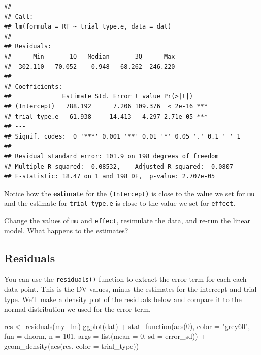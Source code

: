 \documentclass[
  oneside]{book}
\newenvironment{Shaded}{\begin{snugshade}}{\end{snugshade}}
\newcommand{\AttributeTok}[1]{\textcolor[rgb]{0.77,0.63,0.00}{#1}}
\newcommand{\DecValTok}[1]{\textcolor[rgb]{0.00,0.00,0.81}{#1}}
\newcommand{\FunctionTok}[1]{\textcolor[rgb]{0.00,0.00,0.00}{#1}}
\newcommand{\NormalTok}[1]{#1}
\newcommand{\OtherTok}[1]{\textcolor[rgb]{0.56,0.35,0.01}{#1}}
\newcommand{\SpecialCharTok}[1]{\textcolor[rgb]{0.00,0.00,0.00}{#1}}
\newcommand{\StringTok}[1]{\textcolor[rgb]{0.31,0.60,0.02}{#1}}
\begin{document}
\begin{verbatim}
## 
## Call:
## lm(formula = RT ~ trial_type.e, data = dat)
## 
## Residuals:
##      Min       1Q   Median       3Q      Max 
## -302.110  -70.052    0.948   68.262  246.220 
## 
## Coefficients:
##              Estimate Std. Error t value Pr(>|t|)    
## (Intercept)   788.192      7.206 109.376  < 2e-16 ***
## trial_type.e   61.938     14.413   4.297 2.71e-05 ***
## ---
## Signif. codes:  0 '***' 0.001 '**' 0.01 '*' 0.05 '.' 0.1 ' ' 1
## 
## Residual standard error: 101.9 on 198 degrees of freedom
## Multiple R-squared:  0.08532,    Adjusted R-squared:  0.0807 
## F-statistic: 18.47 on 1 and 198 DF,  p-value: 2.707e-05
\end{verbatim}

Notice how the \textbf{estimate} for the \texttt{(Intercept)} is close to the value we set for \texttt{mu} and the estimate for \texttt{trial\_type.e} is close to the value we set for \texttt{effect}.

\begin{try}
Change the values of \texttt{mu} and \texttt{effect}, resimulate the data, and re-run the linear model. What happens to the estimates?

\end{try}

\hypertarget{residuals}{%
\subsection{Residuals}\label{residuals}}

You can use the \texttt{residuals()} function to extract the error term for each each data point. This is the DV values, minus the estimates for the intercept and trial type. We'll make a density plot of the residuals below and compare it to the normal distribution we used for the error term.

\begin{Shaded}
\begin{Highlighting}[]
\NormalTok{res }\OtherTok{\textless{}{-}} \FunctionTok{residuals}\NormalTok{(my\_lm)}
\FunctionTok{ggplot}\NormalTok{(dat) }\SpecialCharTok{+} 
  \FunctionTok{stat\_function}\NormalTok{(}\FunctionTok{aes}\NormalTok{(}\DecValTok{0}\NormalTok{), }\AttributeTok{color =} \StringTok{"grey60"}\NormalTok{,}
                \AttributeTok{fun =}\NormalTok{ dnorm, }\AttributeTok{n =} \DecValTok{101}\NormalTok{,}
                \AttributeTok{args =} \FunctionTok{list}\NormalTok{(}\AttributeTok{mean =} \DecValTok{0}\NormalTok{, }\AttributeTok{sd =}\NormalTok{ error\_sd)) }\SpecialCharTok{+}
  \FunctionTok{geom\_density}\NormalTok{(}\FunctionTok{aes}\NormalTok{(res, }\AttributeTok{color =}\NormalTok{ trial\_type))}
\end{Highlighting}
\end{Shaded}
\end{document}
